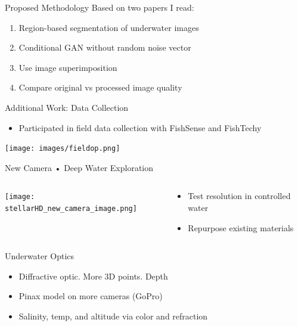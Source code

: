 \begin{frame}{Proposed Methodology}
Based on two papers I read:
    \begin{enumerate}
        \item Region-based segmentation of underwater images
        \item Conditional GAN without random noise vector
        \item Use image superimposition 
        \item Compare original vs processed image quality
    \end{enumerate}
\end{frame}


\begin{frame}{Additional Work: Data Collection}
    \begin{itemize}
        \item Participated in field data collection with FishSense and FishTechy
    \end{itemize}
\end{frame}

\begin{frame}
    \vspace{1em}
    \centering
    \texttt{[image: images/fieldop.png]}
\end{frame}

\begin{frame}{New Camera • Deep Water Exploration}
    \begin{columns}
        \begin{column}{0.5\textwidth}
            \centering
            \texttt{[image: stellarHD\_new\_camera\_image.png]}
        \end{column}
        \begin{column}{0.5\textwidth}
            \begin{itemize}
            \item Test resolution in controlled water
            \item Repurpose existing materials
            \end{itemize}    
        \end{column}
    \end{columns}
\end{frame}

\begin{frame}{Underwater Optics}
    \begin{itemize}
        \item Diffractive optic. More 3D points. Depth
        \item Pinax model on more cameras (GoPro)
        \item Salinity, temp, and altitude via color and refraction
    \end{itemize}    
\end{frame}


